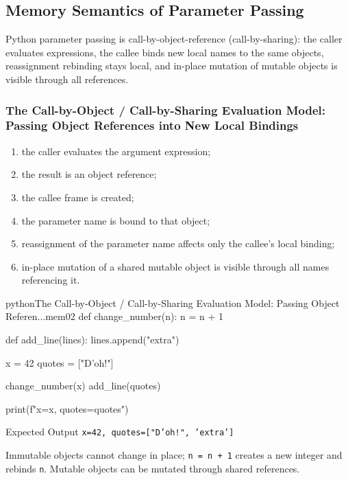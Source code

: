 \subsection{Memory Semantics of Parameter Passing}

Python parameter passing is call-by-object-reference (call-by-sharing): the caller evaluates expressions, the callee binds new local names to the same objects, reassignment rebinding stays local, and in-place mutation of mutable objects is visible through all references.

\subsubsection{The Call-by-Object / Call-by-Sharing Evaluation Model: Passing Object References into New Local Bindings}

\begin{enumerate}
    \item the caller evaluates the argument expression;
    \item the result is an object reference;
    \item the callee frame is created;
    \item the parameter name is bound to that object;
    \item reassignment of the parameter name affects only the callee's local binding;
    \item in-place mutation of a shared mutable object is visible through all names referencing it.
\end{enumerate}

\begin{codebox}[]{python}{The Call-by-Object / Call-by-Sharing Evaluation Model: Passing Object Referen...}{mem02}
def change_number(n):
    n = n + 1

def add_line(lines):
    lines.append("extra")

x = 42
quotes = ["D'oh!"]

change_number(x)
add_line(quotes)

print(f"x={x}, quotes={quotes}")
\end{codebox}


\begin{iobox}{Expected Output}
\texttt{x=42, quotes=["D'oh!", 'extra']} \\
\end{iobox}




Immutable objects cannot change in place; \texttt{n = n + 1} creates a new integer and rebinds \texttt{n}. Mutable objects can be mutated through shared references.

